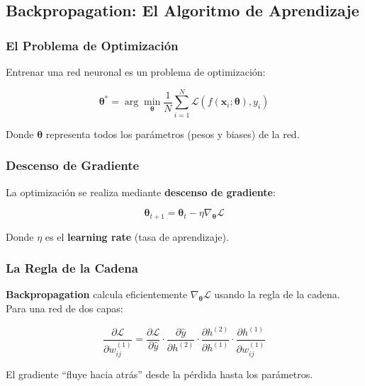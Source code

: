 \documentclass[12pt,a4paper]{article}
\begin{document}
\subsection{Backpropagation: El Algoritmo de Aprendizaje}

\subsubsection{El Problema de Optimización}

Entrenar una red neuronal es un problema de optimización:

\begin{equation}
\boldsymbol{\theta}^* = \arg\min_{\boldsymbol{\theta}} \frac{1}{N} \sum_{i=1}^{N} \mathcal{L}(f(\mathbf{x}_i; \boldsymbol{\theta}), y_i)
\end{equation}

Donde $\boldsymbol{\theta}$ representa todos los parámetros (pesos y biases) de la red.

\subsubsection{Descenso de Gradiente}

La optimización se realiza mediante \textbf{descenso de gradiente}:

\begin{equation}
\boldsymbol{\theta}_{t+1} = \boldsymbol{\theta}_t - \eta \nabla_{\boldsymbol{\theta}} \mathcal{L}
\end{equation}

Donde $\eta$ es el \textbf{learning rate} (tasa de aprendizaje).

\subsubsection{La Regla de la Cadena}

\textbf{Backpropagation} calcula eficientemente $\nabla_{\boldsymbol{\theta}} \mathcal{L}$ usando la regla de la cadena. Para una red de dos capas:

\begin{equation}
\frac{\partial \mathcal{L}}{\partial w^{(1)}_{ij}} = \frac{\partial \mathcal{L}}{\partial \hat{y}} \cdot \frac{\partial \hat{y}}{\partial h^{(2)}} \cdot \frac{\partial h^{(2)}}{\partial h^{(1)}} \cdot \frac{\partial h^{(1)}}{\partial w^{(1)}_{ij}}
\end{equation}

El gradiente ``fluye hacia atrás'' desde la pérdida hasta los parámetros.
\end{document}
